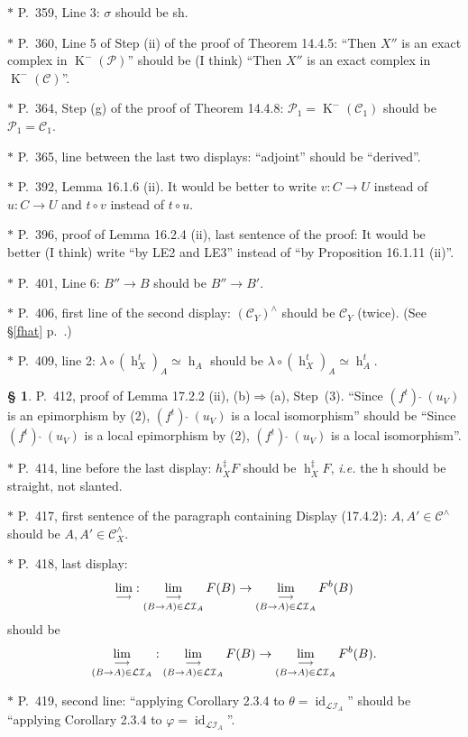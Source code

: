\documentclass[12pt]{article}
\theoremstyle{remark}
\theoremstyle{definition}
\newtheorem{s}[thm]{\S}
\newcommand{\nn}{\noindent}
\newcommand{\cc}{\mathcal}
\newcommand{\mc}{\mathcal}
\newcommand{\oo}{\operatorname}
\newcommand{\C}{\mathcal C}
\newcommand{\pp}{\varphi}
\newcommand{\fthat}{(f^t)\ \widehat{}\ }
\newcommand{\then}{\Rightarrow}
\newcommand{\ilim}{\operatornamewithlimits{\underset{\longrightarrow}{lim}}}
\DeclareMathOperator{\id}{id}
\begin{document}
\nn$*$ P.~359, Line 3: $\sigma$ should be sh.

\nn$*$ P.~360, Line 5 of Step (ii) of the proof of Theorem 14.4.5: ``Then $X''$ is an exact complex in $\oo K^-(\cc P)$'' should be (I think) ``Then $X''$ is an exact complex in $\oo K^-(\cc C)$''.

\nn$*$ P.~364, Step (g) of the proof of Theorem 14.4.8: $\mc P_1=\oo K^-(\C_1)$ should be $\mc P_1=\C_1$.

\nn$*$ P.~365, line between the last two displays: ``adjoint'' should be ``derived''.

\nn$*$ P.~392, Lemma 16.1.6 (ii). It would be better to write $v:C\to U$ instead of $u:C\to U$ and $t\circ v$ instead of $t\circ u$.

\nn$*$ P.~396, proof of Lemma 16.2.4 (ii), last sentence of the proof: It would be better (I think) write ``by LE2 and LE3'' instead of ``by Proposition 16.1.11 (ii)''.

\nn$*$ P.~401, Line 6: $B''\to B$ should be $B''\to B'$.

\nn$*$ P.~406, first line of the second display: $(\C_Y)^\wedge$ should be $\C_Y$ (twice). (See \S\ref{fhat} p.~\pageref{fhat}.)

\nn$*$ P.~409, line 2: $\lambda\circ(\oo h_X^t)_A\simeq\oo h_A$ should be $\lambda\circ(\oo h_X^t)_A\simeq\oo h_A^t$. 

\begin{s}\label{1722}
P.~412, proof of Lemma 17.2.2 (ii), (b)$\then$(a), Step~(3). ``Since $\fthat(u_V)$ is an epimorphism by (2), $\fthat(u_V)$ is a local isomorphism'' should be ``Since $\fthat(u_V)$ is a local epimorphism by (2), $\fthat(u_V)$ is a local isomorphism''.
\end{s}

\nn$*$ P.~414, line before the last display: $h_X^\ddagger F$ should be $\oo h_X^\ddagger F$, \emph{i.e.} the h should be straight, not slanted. 

\nn$*$ P.~417, first sentence of the paragraph containing Display (17.4.2): $A,A'\in\C^\wedge$ should be $A,A'\in\C_X^\wedge$. 

\nn$*$ P.~418, last display: 
$$
\ilim:\ilim_{(B\to A)\in\cc{LI}_A}F(B)\to\ilim_{(B\to A)\in\cc{LI}_A}F^b(B)
$$ 
should be 
$$
\ilim_{(B\to A)\in\cc{LI}_A}:\ilim_{(B\to A)\in\cc{LI}_A}F(B)\to\ilim_{(B\to A)\in\cc{LI}_A}F^b(B).
$$

\nn$*$ P.~419, second line: ``applying Corollary 2.3.4 to $\theta=\id_{\cc{LI}_A}$'' should be ``applying Corollary 2.3.4 to $\pp=\id_{\cc{LI}_A}$''.
\end{document}
